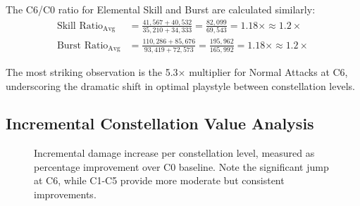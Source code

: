 \documentclass[12pt,a4paper]{article}
\begin{document}
The C6/C0 ratio for Elemental Skill and Burst are calculated similarly:
\begin{align}
\text{Skill Ratio}_{\text{Avg}} &= \frac{41,567 + 40,532}{35,210 + 34,333} = \frac{82,099}{69,543} = 1.18\times \approx 1.2\times \\
\text{Burst Ratio}_{\text{Avg}} &= \frac{110,286 + 85,676}{93,419 + 72,573} = \frac{195,962}{165,992} = 1.18\times \approx 1.2\times
\end{align}

The most striking observation is the 5.3× multiplier for Normal Attacks at C6, underscoring the dramatic shift in optimal playstyle between constellation levels.

\subsection{Incremental Constellation Value Analysis}

\begin{figure}[H]
\centering
{}
\caption{Incremental damage increase per constellation level, measured as percentage improvement over C0 baseline. Note the significant jump at C6, while C1-C5 provide more moderate but consistent improvements.}
\label{fig:constellation_value}
\end{figure}
\end{document}
